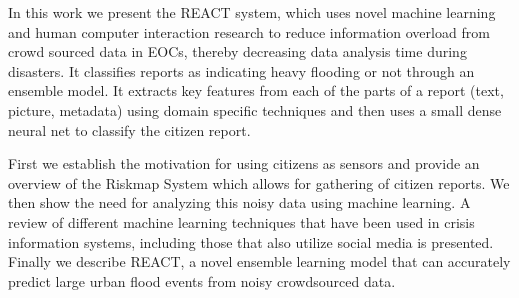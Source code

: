 In this work we present the REACT system, which uses novel machine learning and
human computer interaction research to reduce information overload from crowd
sourced data in EOCs, thereby decreasing data analysis time during disasters.
It classifies reports as indicating heavy flooding or not through an ensemble
model. It extracts key features from each of the parts of a report (text,
picture, metadata) using domain specific techniques and then uses a small dense
neural net to classify the citizen report.

First we establish the motivation for using citizens as sensors and provide an
overview of the Riskmap System which allows for gathering of citizen reports. We
then show the need for analyzing this noisy data using machine learning. A
review of different machine learning techniques that have been used in crisis
information systems, including those that also utilize social media is
presented.  Finally we describe REACT, a novel ensemble learning model that can
accurately predict large urban flood events from noisy crowdsourced data.
